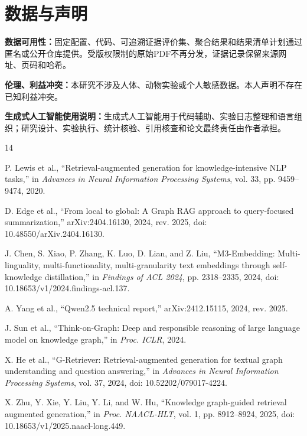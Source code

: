 \documentclass[conference]{IEEEtran}
\begin{document}
\section*{数据与声明}

\textbf{数据可用性：}固定配置、代码、可追溯证据评价集、聚合结果和结果清单计划通过匿名或公开仓库提供。受版权限制的原始PDF不再分发，证据记录保留来源网址、页码和哈希。

\textbf{伦理、利益冲突：}本研究不涉及人体、动物实验或个人敏感数据。本人声明不存在已知利益冲突。

\textbf{生成式人工智能使用说明：}生成式人工智能用于代码辅助、实验日志整理和语言组织；研究设计、实验执行、统计核验、引用核查和论文最终责任由作者承担。

\begin{thebibliography}{14}

 P. Lewis et al., ``Retrieval-augmented generation for knowledge-intensive NLP tasks,'' in \emph{Advances in Neural Information Processing Systems}, vol. 33, pp. 9459--9474, 2020.

 D. Edge et al., ``From local to global: A Graph RAG approach to query-focused summarization,'' arXiv:2404.16130, 2024, rev. 2025, doi: 10.48550/arXiv.2404.16130.

 J. Chen, S. Xiao, P. Zhang, K. Luo, D. Lian, and Z. Liu, ``M3-Embedding: Multi-linguality, multi-functionality, multi-granularity text embeddings through self-knowledge distillation,'' in \emph{Findings of ACL 2024}, pp. 2318--2335, 2024, doi: 10.18653/v1/2024.findings-acl.137.

 A. Yang et al., ``Qwen2.5 technical report,'' arXiv:2412.15115, 2024, rev. 2025.

 J. Sun et al., ``Think-on-Graph: Deep and responsible reasoning of large language model on knowledge graph,'' in \emph{Proc. ICLR}, 2024.

 X. He et al., ``G-Retriever: Retrieval-augmented generation for textual graph understanding and question answering,'' in \emph{Advances in Neural Information Processing Systems}, vol. 37, 2024, doi: 10.52202/079017-4224.

 X. Zhu, Y. Xie, Y. Liu, Y. Li, and W. Hu, ``Knowledge graph-guided retrieval augmented generation,'' in \emph{Proc. NAACL-HLT}, vol. 1, pp. 8912--8924, 2025, doi: 10.18653/v1/2025.naacl-long.449.


\end{thebibliography}
\end{document}
